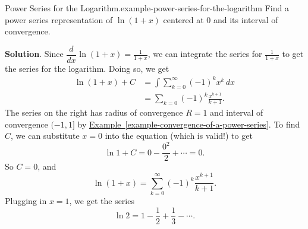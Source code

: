 \documentclass[10pt,]{book}
\numberwithin{equation}{section}
\newcommand{\dv}[3][]{\dfrac{d^{#1} #2}{d #3^{#1}}}
\newcommand{\amp}{&}
\begin{document}
\begin{example}{Power Series for the Logarithm.}{example-power-series-for-the-logarithm}%
\hypertarget{p-957}{}%
Find a power series representation of \(\ln(1 + x)\) centered at \(0\) and its interval of convergence.%
\par\smallskip%
\noindent\textbf{Solution}.\hypertarget{solution-194}{}\quad%
\hypertarget{p-958}{}%
Since \(\dv{}{x}\ln(1 + x) = \frac{1}{1 + x}\), we can integrate the series for \(\frac{1}{1 + x}\) to get the series for the logarithm. Doing so, we get%
\begin{align*}
\ln(1 + x) + C \amp = \int\sum_{k=0}^{\infty}(-1)^{k}x^{k}\,dx \\
\amp = \sum_{k=0} (-1)^{k} \frac{x^{k+1}}{k+1}\text{.}
\end{align*}
The series on the right has radius of convergence \(R = 1\) and interval of convergence \((-1, 1]\) by \hyperref[example-convergence-of-a-power-series]{Example~\ref{example-convergence-of-a-power-series}}. To find \(C\), we can substitute \(x = 0\) into the equation (which is valid!) to get%
\begin{equation*}
\ln1 + C = 0 - \frac{0^{2}}{2} + \cdots = 0\text{.}
\end{equation*}
So \(C = 0\), and%
\begin{equation*}
\ln(1 + x) = \sum_{k=0}^{\infty}(-1)^{k}\frac{x^{k+1}}{k+1}\text{.}
\end{equation*}
Plugging in \(x = 1\), we get the series%
\begin{equation*}
\ln2 = 1 - \frac{1}{2} + \frac{1}{3} - \cdots\text{.}
\end{equation*}
%
\end{example}
%
%
\typeout{************************************************}
\typeout{************************************************}
%
\end{document}
